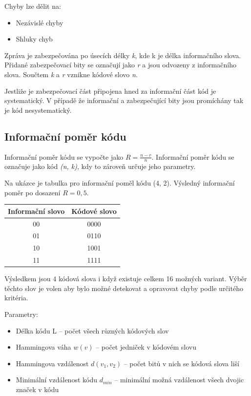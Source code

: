 Chyby lze dělit na:
\begin{itemize}
    \item Nezávislé chyby
    \item Shluky chyb
\end{itemize}

Zpráva je zabezpečována po úsecích délky \textit{k}, kde k je délka informačního slova.
Přidané zabezpečovací bity se označují jako \textit{r} a jsou odvozeny z informačního slova.
Součtem \textit{k} a \textit{r} vznikne kódové slovo \textit{n}.

Jestliže je zabezpečovací část připojena hned za informační část kód je systematický.
V případě že informační a zabezpečující bity jsou promíchány tak je kód nesystematický.

\subsection{Informační poměr kódu}

Informační poměr kódu se vypočte jako $R=\frac{n-r}{n}$.
Informační poměr kódu se označuje jako kód \textit{(n, k)}, kdy to zároveň určuje jeho parametry.


Na ukázce je tabulka pro informační poměl kódu (4, 2). Výsledný informační poměr po dosazení $R = 0,5$.

\begin{table}[ht]
    \centering
    \begin{tabular}{|c|c|}
        \hline
        Informační slovo & Kódové slovo \\\hline
        00 & 0000 \\\hline
        01 & 0110 \\\hline
        10 & 1001 \\\hline
        11 & 1111 \\\hline
    \end{tabular}
\end{table}

Výsledkem jsou 4 kódová slova i když existuje celkem 16 možných variant.
Výběr těchto slov je volen aby bylo možné detekovat a opravovat chyby podle určitého kritéria.

Parametry:
\begin{itemize}
    \item Délka kódu L -- počet všech různých kódových slov
    \item Hammingova váha $w(v)$ -- počet jedniček v kódovém slovu
    \item Hammingova vzdálenost $d(v_1,v_2)$ -- počet bitů v nich se kódová slova liší
    \item Minimální vzdálenost kódu $d_{min}$ -- minimální možná vzdálenost všech dvojic značek v kódu
\end{itemize}

